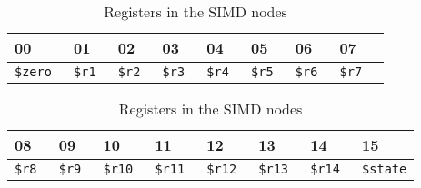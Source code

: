 \begin{table}[h]
  \centering
  \begin{tabularx}{\linewidth}{XXXXXXXXX}\toprule
    00 & 01 & 02 & 03 & 04 & 05 & 06 & 07 \\ \midrule
    \tt \$zero & \tt \$r1 & \tt \$r2 & \tt \$r3 & \tt \$r4 & \tt \$r5 &
    \tt \$r6 & \tt \$r7\\ \bottomrule
  \end{tabularx}
  \begin{tabularx}{\linewidth}{XXXXXXXX}
    08 & 09 & 10 & 11 & 12 & 13 & 14 & 15 \\ \midrule
    \tt \$r8 & \tt \$r9 & \tt \$r10 & \tt \$r11 & \tt \$r12 & \tt \$r13 &
    \tt \$r14 & \tt \$state\\ \bottomrule
  \end{tabularx}
  \caption{Registers in the SIMD nodes}
  \label{tab:simd-registers}
\end{table}
